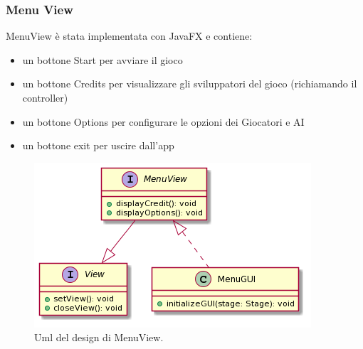 \documentclass[a4paper,12pt]{report}
\begin{document}
    \subsubsection{Menu View}
    MenuView è stata implementata con JavaFX e contiene:
	\begin{itemize}
	    \item un bottone Start per avviare il gioco
	    \item un bottone Credits per visualizzare gli sviluppatori del gioco (richiamando il controller)
	    \item un bottone Options per configurare le opzioni dei Giocatori e AI
	    \item un bottone exit per uscire dall'app
	\end{itemize}
	\newline
    \begin{figure}[h]
    \centering{}
    \includegraphics[width=\textwidth]{images/squarcialupi/MenuView.png}
    \caption{Uml del design di MenuView.}
    \label{img:MenuView}
    \end{figure}
\end{document}
